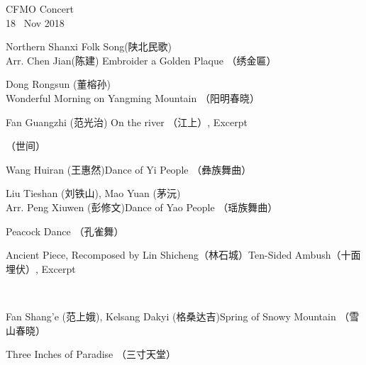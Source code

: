 \documentclass[letter,6pt,poets]{ConcProg}
\begin{document}
\begin{spacing}{1.1}
\begin{programme}{
    CFMO Concert
\\  {\normalsize 18 ~Nov 2018}
}
\begin{part}[]
    \begin{composition}{Northern Shanxi Folk Song(陕北民歌)\\Arr. Chen Jian(陈建)} {}{Embroider a Golden Plaque  （绣金匾）}{}
    \end{composition}
    \begin{composition}{Dong Rongsun (董榕孙)} {}{Wonderful Morning on Yangming Mountain  （阳明春晓）
}{}
    \end{composition}
    \begin{composition}{Fan Guangzhi (范光治)} {}{On the river （江上）, Excerpt}{}
                   {}{}
    \end{composition}
     \begin{composition}{} {}{（世间）}{}
                   {}{}
    \end{composition}    
    \begin{composition}{Wang Huiran (王惠然)}{}{Dance of Yi People  （彝族舞曲）}{}
                   {}{}
    \end{composition}
    \begin{composition}{Liu Tieshan (刘铁山), Mao Yuan (茅沅) \\Arr. Peng Xiuwen (彭修文)}{}{Dance of Yao People  （瑶族舞曲）}{}
    \end{composition}
    \begin{composition}{}{}{Peacock Dance （孔雀舞） }{}
                   {}{}
    \end{composition}
    \begin{composition}{Ancient Piece, Recomposed by Lin Shicheng（林石城）}{}{Ten-Sided Ambush（十面埋伏）, Excerpt}{}
    \end{composition}\\
    \begin{composition}{Fan Shang'e (范上娥), Kelsang Dakyi (格桑达吉)}{}{Spring of Snowy Mountain   （雪山春晓）}{}
                   {}{}
    \end{composition}
    \begin{composition}{}{}{Three Inches of Paradise  （三寸天堂）}{}
    \end{composition}

\end{part}
\end{programme}
\end{spacing}
\end{document}
